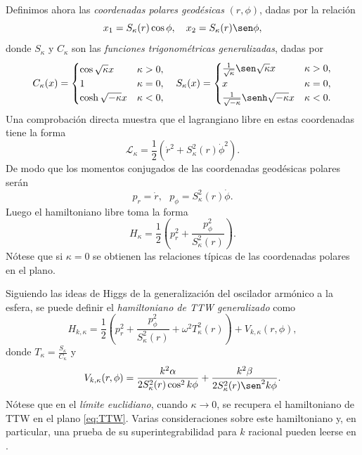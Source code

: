 \documentclass[11pt,a4paper,twoside]{article}
\theoremstyle{definition} \newtheorem{defn}[thm]{Definición}
\theoremstyle{definition} \newtheorem{ejemplo}[thm]{Ejemplo}
\theoremstyle{definition} \newtheorem{ejercicio}[thm]{Ejercicio}
\theoremstyle{remark} \newtheorem*{obs}{Observación}
\begin{document}
Definimos ahora las \emph{coordenadas polares geodésicas} $(r,\phi)$, dadas por la relación
\begin{equation}
    x_1=S_\kappa (r)\cos \phi,\ \ \
    x_2=S_\kappa (r)\sen \phi,
\end{equation}
donde $S_\kappa$ y $C_\kappa$ son las \emph{funciones trigonométricas generalizadas}, dadas por
\begin{equation}
  C_{\kappa}(x)=
  \begin{cases}
    \cos \sqrt{\kappa} x & \kappa >0, \\
    1 & \kappa =0, \\
    \cosh \sqrt{-\kappa} x & \kappa <0, 
  \end{cases}
  \ \ \ 
  S_{\kappa}(x)=
  \begin{cases}
    \frac{1}{\sqrt{\kappa}}\sen \sqrt{\kappa} x & \kappa >0, \\
    x & \kappa =0, \\
    \frac{1}{\sqrt{-\kappa}}\senh \sqrt{-\kappa} x & \kappa <0. 
  \end{cases}
\end{equation}
Una comprobación directa muestra que el lagrangiano libre en estas coordenadas tiene la forma
\begin{equation}
  \mathcal{L} _\kappa = \frac{1}{2}(\dot{r}^2+S_{\kappa}^2 (r) \dot{\phi}^2).
\end{equation}
De modo que los momentos conjugados de las coordenadas geodésicas polares serán
\begin{equation}
  p_r=\dot{r}, \ \ \ 
  p_{\phi}=S_{\kappa}^2(r) \dot{\phi}.
\end{equation}
Luego el hamiltoniano libre toma la forma
\begin{equation}
  H_{\kappa}=\frac{1}{2}\left( p_r^2 + \frac{p^2_\phi}{S_{\kappa}^2(r)} \right) .
\end{equation}
Nótese que si $\kappa=0$ se obtienen las relaciones típicas de las coordenadas polares en el plano.
  
Siguiendo las ideas de Higgs \cite{higgs} de la generalización del oscilador armónico a la esfera, se puede definir el \emph{hamiltoniano de TTW generalizado} como
\begin{equation}
  H_{k,\kappa}=\frac{1}{2}\left( p_r^2 + \frac{p^2_\phi}{S_{\kappa}^2(r)}+ \omega^2 T_\kappa^2(r)\right) + V_{k,\kappa}(r,\phi)  ,
\end{equation}
donde $T_{\kappa}=\frac{S_\kappa}{C_\kappa}$ y
\begin{equation}
  V_{k,\kappa}(r,\phi)=\frac{k^2\alpha}{2S_\kappa^2(r)\cos^2k\phi} +\frac{k^2\beta}{2S_\kappa^2(r)\sen^2 k\phi}.
\end{equation}
Nótese que en el \emph{límite euclidiano}, cuando $\kappa\rightarrow 0$, se recupera el hamiltoniano de TTW en el plano \eqref{eq:TTW}. Varias consideraciones sobre este hamiltoniano y, en particular, una prueba de su superintegrabilidad para $k$ racional pueden leerse en \cite{ranada}.
\end{document}
